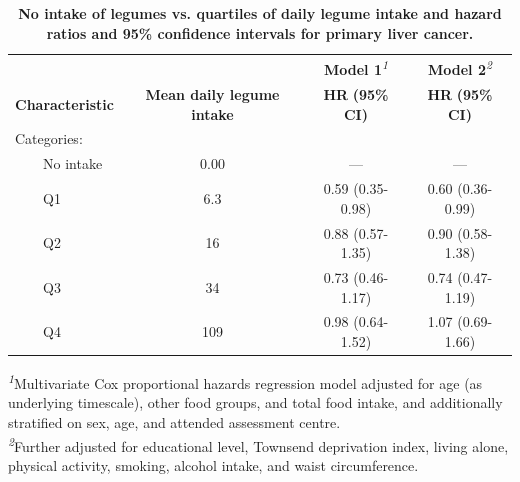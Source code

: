 \documentclass[
]{article}
\begin{document}
\begin{table}[h]
\caption{\label{tab:legume}\textbf{No intake of legumes vs. quartiles of daily legume intake and hazard ratios and 95\% confidence intervals for primary liver cancer.}} 
\fontsize{9.0pt}{10.8pt}\selectfont
\begin{tabular*}{1\linewidth}{@{\extracolsep{\fill}}lccc}
\toprule
 &  & \textbf{Model 1}\textsuperscript{\textit{1}} & \textbf{Model 2}\textsuperscript{\textit{2}} \\ 
\cmidrule(lr){3-3} \cmidrule(lr){4-4}
\textbf{Characteristic} & \textbf{Mean daily legume intake} & \textbf{HR} \textbf{(95\% CI)} & \textbf{HR} \textbf{(95\% CI)} \\ 
\midrule\addlinespace[2.5pt]
Categories: &  &  &  \\ 
    No intake & 0.00 & — & — \\ 
    Q1 & 6.3 & 0.59 (0.35-0.98) & 0.60 (0.36-0.99) \\ 
    Q2 & 16 & 0.88 (0.57-1.35) & 0.90 (0.58-1.38) \\ 
    Q3 & 34 & 0.73 (0.46-1.17) & 0.74 (0.47-1.19) \\ 
    Q4 & 109 & 0.98 (0.64-1.52) & 1.07 (0.69-1.66) \\ 
\bottomrule
\end{tabular*}
\begin{minipage}{\linewidth}
\textsuperscript{\textit{1}}Multivariate Cox proportional hazards regression model adjusted for age (as underlying timescale), other food groups, and total food intake, and additionally stratified on sex, age, and attended assessment centre.\\
\textsuperscript{\textit{2}}Further adjusted for educational level, Townsend deprivation index, living alone, physical activity, smoking, alcohol intake, and waist circumference.\\
\end{minipage}
\end{table}

\clearpage
\end{document}
